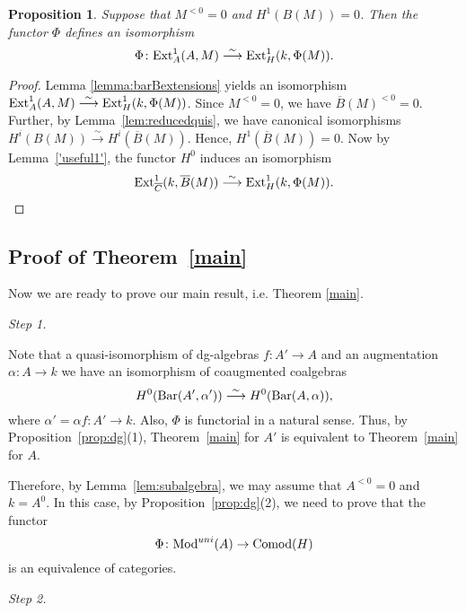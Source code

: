 \documentclass[10pt,russian]{article}
\theoremstyle{plain}
\newtheorem{prop}[theorem]{Proposition}
\theoremstyle{definition}
\newcommand{\Barr}{{\rm Bar}}
\newcommand{\Mod}{{\rm Mod}}
\newcommand{\Comod}{{\rm Comod}}
\newcommand{\Ext}{{\rm Ext}}
\begin{document}
\begin{prop}\label{prop:Ext}
Suppose that $M^{<0}=0$ and $H^1(B(M))=0$. Then the functor $\Phi$ defines an isomorphism
$$
\Phi\colon \Ext^1_A(A,M)\stackrel{\sim}\longrightarrow \Ext^1_H(k,\Phi(M)).
$$
\end{prop}
\begin{proof}
Lemma \ref{lemma:barBextensions} yields an isomorphism $\Ext^1_A(A,M) \stackrel{\sim}\longrightarrow \Ext^1_H (k,\Phi(M))$. Since $M^{<0}=0$, we have $\overline{B}(M)^{<0}=0$. Further, by Lemma~\ref{lem:reducedquis}, we have canonical isomorphisms ${H^i(B(M))\stackrel{\sim}\longrightarrow H^i(\overline{B}(M))}$. Hence, $H^1(\overline{B}(M))=0$. Now by Lemma~\ref{'useful1'}, the functor $H^0$ induces an isomorphism
$$
\Ext^1_{\overline{C}}(k,\overline{B}(M))\stackrel{\sim}\longrightarrow \Ext^1_{H}(k,\Phi(M)).
$$
\end{proof}


\subsection{Proof of Theorem~\ref{main}}

Now we are ready to prove our main result, i.e. Theorem \ref{main}. \medskip

{\it Step 1.}

Note that a quasi-isomorphism of dg-algebras $f\colon A'\to A$ and an augmentation $\alpha\colon A\to k$ we have an isomorphism of coaugmented coalgebras
$$
H^0(\Barr(A',\alpha'))\stackrel{\sim}\longrightarrow H^0(\Barr(A,\alpha)),
$$
where $\alpha'=\alpha f\colon A'\to k$. Also, $\Phi$ is functorial in a natural sense. Thus, by Proposition~\ref{prop:dg}(1), Theorem~\ref{main} for $A'$ is equivalent to Theorem~\ref{main} for $A$.

Therefore, by Lemma~\ref{lem:subalgebra}, we may assume that $A^{<0}=0$ and $k=A^0$. In this case, by Proposition~\ref{prop:dg}(2), we need to prove that the functor
$$
\Phi\colon \Mod^{uni}(A)\to \Comod(H)
$$
is an equivalence of categories. \medskip

{\it Step 2.} \smallskip

\end{document}
